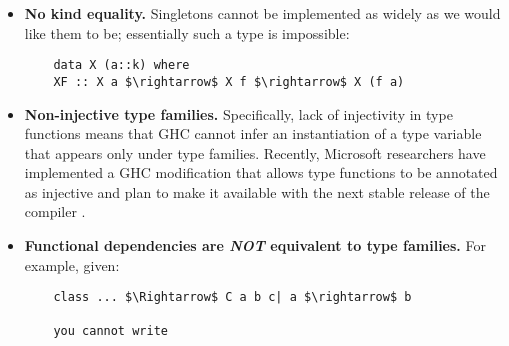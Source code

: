 \begin{itemize}
    \item \textbf{No kind equality.} Singletons cannot be implemented as widely 
    as we would like them to be; essentially such a type is impossible:
    \begin{lstlisting}
    data X (a::k) where
    XF :: X a $\rightarrow$ X f $\rightarrow$ X (f a)
    \end{lstlisting}
    \item \textbf{Non-injective type families.} Specifically, lack of 
    injectivity in type functions means that GHC cannot infer an instantiation 
    of a type variable that appears only under type families. Recently, 
    Microsoft researchers have implemented a GHC modification that allows type 
    functions to be annotated as injective and plan to make it available with 
    the next stable release of the compiler \cite{microsoft}.
    \item \textbf{Functional dependencies are \textit{NOT} equivalent to type 
        families.} For example, given:
    \begin{lstlisting}
    class ... $\Rightarrow$ C a b c| a $\rightarrow$ b
    
    you cannot write
    

\end{lstlisting}
\end{itemize}
